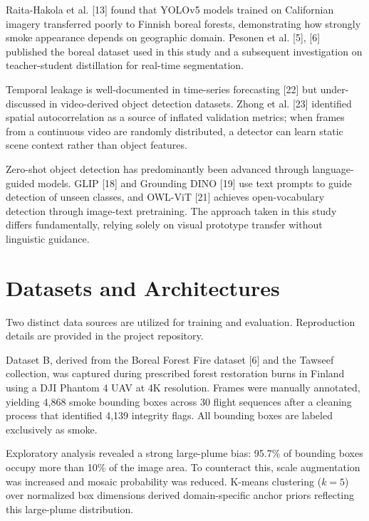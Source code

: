 \documentclass[conference]{IEEEtran}
\begin{document}
Raita-Hakola et al. [13] found that YOLOv5 models trained on Californian imagery transferred poorly to Finnish boreal forests, demonstrating how strongly smoke appearance depends on geographic domain. Pesonen et al. [5], [6] published the boreal dataset used in this study and a subsequent investigation on teacher-student distillation for real-time segmentation.

Temporal leakage is well-documented in time-series forecasting [22] but under-discussed in video-derived object detection datasets. Zhong et al. [23] identified spatial autocorrelation as a source of inflated validation metrics; when frames from a continuous video are randomly distributed, a detector can learn static scene context rather than object features.

Zero-shot object detection has predominantly been advanced through language-guided models. GLIP [18] and Grounding DINO [19] use text prompts to guide detection of unseen classes, and OWL-ViT [21] achieves open-vocabulary detection through image-text pretraining. The approach taken in this study differs fundamentally, relying solely on visual prototype transfer without linguistic guidance.

\section{Datasets and Architectures}
Two distinct data sources are utilized for training and evaluation. Reproduction details are provided in the project repository.

Dataset B, derived from the Boreal Forest Fire dataset [6] and the Tawseef collection, was captured during prescribed forest restoration burns in Finland using a DJI Phantom 4 UAV at 4K resolution. Frames were manually annotated, yielding 4,868 smoke bounding boxes across 30 flight sequences after a cleaning process that identified 4,139 integrity flags. All bounding boxes are labeled exclusively as smoke.

Exploratory analysis revealed a strong large-plume bias: 95.7\% of bounding boxes occupy more than 10\% of the image area. To counteract this, scale augmentation was increased and mosaic probability was reduced. K-means clustering ($k = 5$) over normalized box dimensions derived domain-specific anchor priors reflecting this large-plume distribution.
\end{document}
